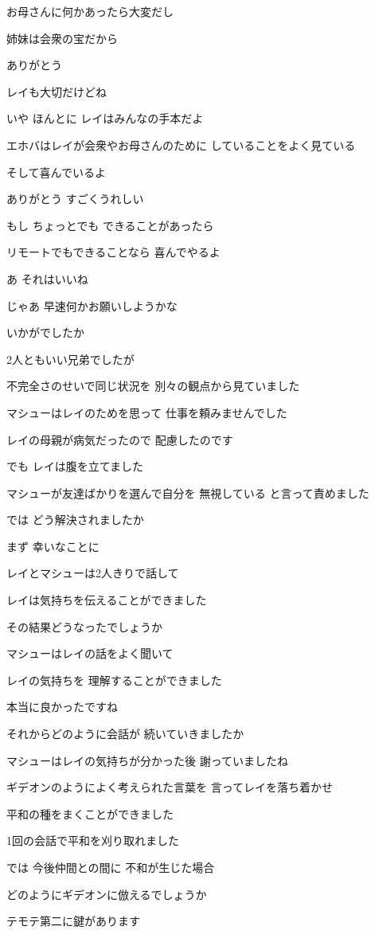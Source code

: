 \documentclass[twocolumn]{jsarticle}
\begin{document}
お母さんに何かあったら大変だし

姉妹は会衆の宝だから

ありがとう

レイも大切だけどね

いや ほんとに
レイはみんなの手本だよ

エホバはレイが会衆やお母さんのために
していることをよく見ている

そして喜んでいるよ

ありがとう すごくうれしい

もし ちょっとでも
できることがあったら

リモートでもできることなら
喜んでやるよ

あ それはいいね

じゃあ 早速何かお願いしようかな

いかがでしたか

2人ともいい兄弟でしたが

不完全さのせいで同じ状況を
別々の観点から見ていました

マシューはレイのためを思って
仕事を頼みませんでした

レイの母親が病気だったので
配慮したのです

でも レイは腹を立てました

マシューが友達ばかりを選んで自分を
無視している と言って責めました

では どう解決されましたか

まず 幸いなことに

レイとマシューは2人きりで話して

レイは気持ちを伝えることができました

その結果どうなったでしょうか

マシューはレイの話をよく聞いて

レイの気持ちを
理解することができました

本当に良かったですね

それからどのように会話が
続いていきましたか

マシューはレイの気持ちが分かった後
謝っていましたね

ギデオンのようによく考えられた言葉を
言ってレイを落ち着かせ

平和の種をまくことができました

1回の会話で平和を刈り取れました

では 今後仲間との間に
不和が生じた場合

どのようにギデオンに倣えるでしょうか

テモテ第二に鍵があります
\end{document}
